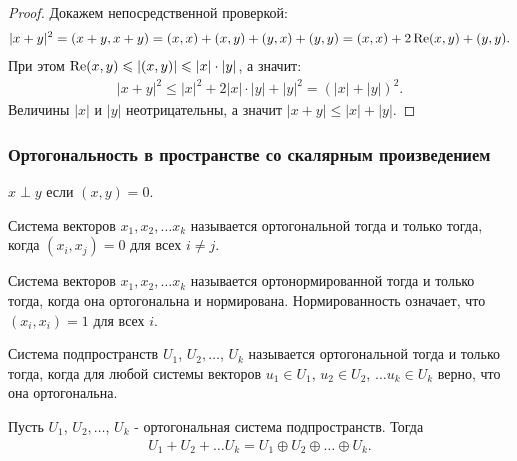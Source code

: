 \begin{proof}
    Докажем непосредственной проверкой:
    \begin{gather*}
        | x + y |^2 = (x+y, x+y) = (x, x) + (x, y) + (y, x) + (y, y) = (x, x) + 2 \operatorname{Re} (x, y) + (y, y).
    \end{gather*}
    При этом $\operatorname{Re} (x, y) \leqslant |(x, y)| \leqslant |x| \cdot |y|$, а значит:
    \begin{gather*}
        |x + y|^2 \leq |x|^2 + 2 |x| \cdot |y| + |y|^2 = (|x| + |y|)^2.
    \end{gather*}
    Величины $|x|$ и $|y|$ неотрицательны, а значит $|x+y| \leq |x| + |y|$.
\end{proof}

\subsubsection{Ортогональность в пространстве со скалярным произведением}

\begin{definition}
    $x \perp y$ если $(x, y) = 0$.
\end{definition}

\begin{definition}
    Система векторов $x_1, x_2, \dots x_k$ называется ортогональной тогда и только тогда, когда 
    $(x_i, x_j) = 0$ для всех $i \neq j$.
\end{definition}

\begin{definition}
    Система векторов $x_1, x_2, \dots x_k$ называется ортонормированной тогда и только тогда, когда 
    она ортогональна и нормирована. Нормированность означает, что $(x_i, x_i) = 1$ для всех $i$.
\end{definition}

\begin{definition}
    Система подпространств $U_1$, $U_2, \dots$, $U_k$ называется ортогональной тогда и только тогда,
    когда для любой системы векторов $u_1 \in U_1$, $u_2 \in U_2$, $\dots u_k \in U_k$ верно, 
    что она ортогональна.
\end{definition}

\begin{proposition}
    Пусть $U_1$, $U_2, \dots$, $U_k$ - ортогональная система подпространств. Тогда 
    \begin{gather*}
        U_1 + U_2 + \dots U_k = U_1 \oplus U_2 \oplus \dots \oplus U_k.
    \end{gather*}
\end{proposition}

